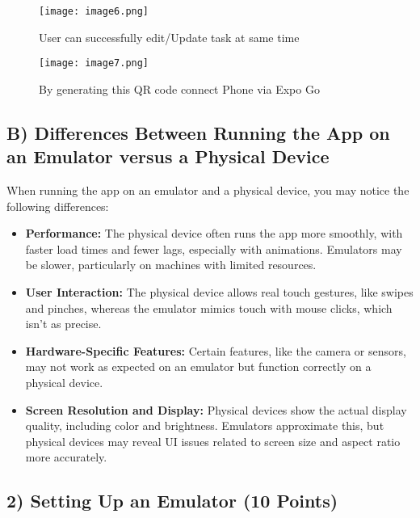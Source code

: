 \documentclass{article}
\begin{document}
\begin{figure}
    \centering
    \texttt{[image: image6.png]} 
    \caption{ User can successfully edit/Update task at same time}
    \label{fig:screenshot6}
\end{figure}

\begin{figure}
    \centering
    \texttt{[image: image7.png]}
    \caption{By generating this QR code connect Phone via Expo Go}
    \label{fig:screenshot7}
\end{figure}
\subsection*{B) Differences Between Running the App on an Emulator versus a Physical Device}

When running the app on an emulator and a physical device, you may notice the following differences:
\begin{itemize}
    \item \textbf{Performance:} The physical device often runs the app more smoothly, with faster load times and fewer lags, especially with animations. Emulators may be slower, particularly on machines with limited resources.
    \item \textbf{User Interaction:} The physical device allows real touch gestures, like swipes and pinches, whereas the emulator mimics touch with mouse clicks, which isn’t as precise.
    \item \textbf{Hardware-Specific Features:} Certain features, like the camera or sensors, may not work as expected on an emulator but function correctly on a physical device.
    \item \textbf{Screen Resolution and Display:} Physical devices show the actual display quality, including color and brightness. Emulators approximate this, but physical devices may reveal UI issues related to screen size and aspect ratio more accurately.
\end{itemize}

\subsection*{2) Setting Up an Emulator (10 Points)}
\end{document}
